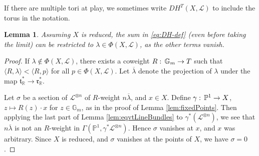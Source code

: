 \documentclass[11pt]{amsart}
\newtheorem{lemma}[Thm]{Lemma}
\theoremstyle{definition}
\newcommand{\RR}{\mathbb{R}}
\newcommand{\PP}{\mathbb{P}}
\newcommand\lie[1]{{\mathfrak #1}}
\newcommand\tensor\otimes
\newcommand\calL{{\mathcal L}}
\newcommand\Gm{{\mathbb G}_m}
\renewcommand{\colon}{\mathrel{:}}
\renewcommand{\colon}{:\mkern\thinmuskip}
\begin{document}
If there are multiple tori at play, we sometimes write $DH^T(X, \calL)$
to include the torus in the notation.

\begin{lemma}\label{lem:multDiagram}
  Assuming $X$ is reduced,
  the sum in \eqref{eq:DH-def} (even before taking the limit) can be restricted to
  $\lambda \in \Phi(X,\calL)$, as the other terms vanish.
\end{lemma}

\begin{proof}
  If $\lambda \notin \Phi(X,\calL)$, there exists a coweight
  $R\colon \Gm\to T$ such that
  $\langle R, \lambda\rangle < \langle R, p\rangle$ for all
  $p\in \Phi(X,\calL)$.  Let $\overline\lambda$ denote the projection
  of $\lambda$ under the map $\lie t^*_\RR \to \lie r^*_\RR$.
  
  Let $\sigma$ be a section of $\calL^{\tensor n}$ of $R$-weight
  $n\overline\lambda$, and $x\in X$. 
  Define $\gamma\colon \PP^1 \to X$, $z\mapsto R(z)\cdot x$ for
  $z\in \Gm$, as in the proof of Lemma \ref{lem:fixedPoints}.
  Then applying the last part of Lemma \ref{lem:eqvtLineBundles}
  to $\gamma^*(\calL^{\tensor n})$, we see that $n\overline\lambda$
  is not an $R$-weight in $\Gamma(\PP^1,\gamma^*\calL^{\tensor n})$.
  Hence $\sigma$ vanishes at $x$, and $x$ was arbitrary.
  Since $X$ is reduced, and $\sigma$ vanishes at the points of $X$,
  we have $\sigma=0$.
\end{proof}
\end{document}

